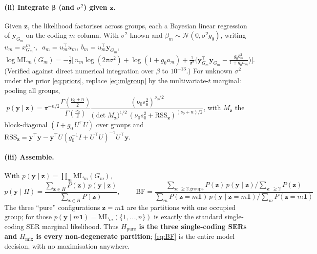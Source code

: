 \documentclass[11pt]{article}
\newcommand{\N}{\mathcal{N}}
\newcommand{\BF}{\mathrm{BF}}
\begin{document}
\paragraph{(ii) Integrate $\bm\beta$ (and $\sigma^2$) given $\bm z$.}
Given $\bm z$, the likelihood factorises across groups, each a Bayesian linear
regression of $\bm y_{G_m}$ on the coding-$m$ column. With $\sigma^2$ known and
$\beta_m\sim\N(0,\sigma^2 g_0)$, writing $u_m=x^m_{G_m}\!\!\cdot,\ $
$a_m=u_m^\top u_m,\ b_m=u_m^\top\bm y_{G_m}$,
\begin{equation}
\log \mathrm{ML}_m(G_m)=
-\tfrac12\Big[\,n_m\log(2\pi\sigma^2)+\log(1+g_0 a_m)
+\tfrac1{\sigma^2}\big(\bm y_{G_m}^\top\bm y_{G_m}-\tfrac{g_0 b_m^2}{1+g_0 a_m}\big)\Big].
\label{eq:mlgroup}
\end{equation}
(Verified against direct numerical integration over $\beta$ to $10^{-13}$.) For
unknown $\sigma^2$ under the prior \eqref{eq:priors}, replace \eqref{eq:mlgroup}
by the multivariate-$t$ marginal: pooling all groups,
$\;p(\bm y\mid\bm z)=\pi^{-n/2}\dfrac{\Gamma(\frac{\nu_0+n}{2})}{\Gamma(\frac{\nu_0}{2})}
\dfrac{(\nu_0 s_0^2)^{\nu_0/2}}{\big(\det M_{\bm z}\big)^{1/2}\,(\nu_0 s_0^2+\mathrm{RSS}_{\bm z})^{(\nu_0+n)/2}}$,
with $M_{\bm z}$ the block-diagonal $(I+g_0\,U^\top U)$ over groups and
$\mathrm{RSS}_{\bm z}=\bm y^\top\bm y-\bm y^\top U(g_0^{-1}I+U^\top U)^{-1}U^\top\bm y$.

\paragraph{(iii) Assemble.} With $p(\bm y\mid\bm z)=\prod_m \mathrm{ML}_m(G_m)$,
\begin{equation}
p(\bm y\mid H)=\frac{\sum_{\bm z\in H}P(\bm z)\,p(\bm y\mid\bm z)}{\sum_{\bm z\in H}P(\bm z)},
\qquad
\boxed{\;\BF=\frac{\sum_{\bm z:\,\ge2\ \text{groups}}P(\bm z)\,p(\bm y\mid\bm z)\big/\!\!\sum_{\bm z:\,\ge2}P(\bm z)}
{\sum_{m}P(\bm z{=}m\bm 1)\,p(\bm y\mid\bm z{=}m\bm 1)\big/\!\!\sum_m P(\bm z{=}m\bm1)}\;}
\label{eq:BF}
\end{equation}
The three ``pure'' configurations $\bm z=m\bm 1$ are the partitions with one
occupied group; for those $p(\bm y\mid m\bm 1)=\mathrm{ML}_m(\{1,\dots,n\})$ is
exactly the standard single-coding SER marginal likelihood. Thus
\textbf{$H_{\mathrm{pure}}$ is the three single-coding SERs and $H_{\mathrm{mix}}$
is every non-degenerate partition}; \eqref{eq:BF} is the entire model decision,
with no maximisation anywhere.
\end{document}
